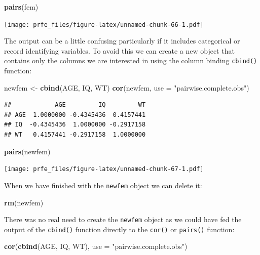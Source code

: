 \documentclass[]{book}
\newenvironment{Shaded}{\begin{snugshade}}{\end{snugshade}}
\newcommand{\KeywordTok}[1]{\textcolor[rgb]{0.13,0.29,0.53}{\textbf{#1}}}
\newcommand{\DataTypeTok}[1]{\textcolor[rgb]{0.13,0.29,0.53}{#1}}
\newcommand{\StringTok}[1]{\textcolor[rgb]{0.31,0.60,0.02}{#1}}
\newcommand{\NormalTok}[1]{#1}
\theoremstyle{definition}
\theoremstyle{definition}
\theoremstyle{definition}
\theoremstyle{remark}
\begin{document}
\begin{Shaded}
\begin{Highlighting}[]
\KeywordTok{pairs}\NormalTok{(fem)}
\end{Highlighting}
\end{Shaded}

\texttt{[image: prfe\_files/figure-latex/unnamed-chunk-66-1.pdf]}

The output can be a little confusing particularly if it includes
categorical or record identifying variables. To avoid this we can create
a new object that contains only the columns we are interested in using
the column binding \texttt{cbind()} function:

\begin{Shaded}
\begin{Highlighting}[]
\NormalTok{newfem <-}\StringTok{ }\KeywordTok{cbind}\NormalTok{(AGE, IQ, WT)}
\KeywordTok{cor}\NormalTok{(newfem, }\DataTypeTok{use =} \StringTok{"pairwise.complete.obs"}\NormalTok{)}
\end{Highlighting}
\end{Shaded}

\begin{verbatim}
##            AGE         IQ         WT
## AGE  1.0000000 -0.4345436  0.4157441
## IQ  -0.4345436  1.0000000 -0.2917158
## WT   0.4157441 -0.2917158  1.0000000
\end{verbatim}

\begin{Shaded}
\begin{Highlighting}[]
\KeywordTok{pairs}\NormalTok{(newfem)}
\end{Highlighting}
\end{Shaded}

\texttt{[image: prfe\_files/figure-latex/unnamed-chunk-67-1.pdf]}

When we have finished with the \texttt{newfem} object we can delete it:

\begin{Shaded}
\begin{Highlighting}[]
\KeywordTok{rm}\NormalTok{(newfem)}
\end{Highlighting}
\end{Shaded}

There was no real need to create the \texttt{newfem} object as we could
have fed the output of the \texttt{cbind()} function directly to the
\texttt{cor()} or \texttt{pairs()} function:

\begin{Shaded}
\begin{Highlighting}[]
\KeywordTok{cor}\NormalTok{(}\KeywordTok{cbind}\NormalTok{(AGE, IQ, WT), }\DataTypeTok{use =} \StringTok{"pairwise.complete.obs"}\NormalTok{)}
\end{Highlighting}
\end{Shaded}
\end{document}
